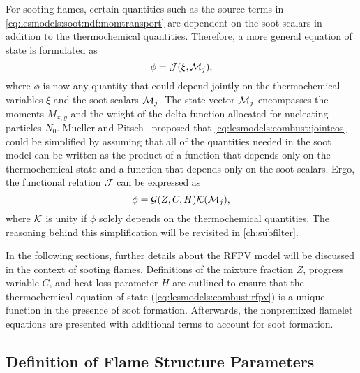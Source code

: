 For sooting flames, certain quantities such as the source terms in \cref{eq:lesmodels:soot:ndf:momtransport} are dependent on the soot scalars in addition to the thermochemical quantities. Therefore, a more general equation of state is formulated as
\begin{equation}\label{eq:lesmodels:combust:jointeos}
  \phi = \mathcal{J}(\xi, \mathcal{M}_j),
\end{equation}
where $\phi$ is now any quantity that could depend jointly on the thermochemical variables $\xi$ and the soot scalars $\mathcal{M}_j$. The state vector $\mathcal{M}_j$ encompasses the moments $M_{x,y}$ and the weight of the delta function allocated for nucleating particles $N_0$. Mueller and Pitsch~\cite{subfilterpdf2011} proposed that \cref{eq:lesmodels:combust:jointeos} could be simplified by assuming that all of the quantities needed in the soot model can be written as the product of a function that depends only on the thermochemical state and a function that depends only on the soot scalars. Ergo, the functional relation $\mathcal{J}$ can be expressed as
\begin{equation}\label{eq:lesmodels:combust:producteos}
  \phi = \mathcal{G}(Z, C, H)\mathcal{K}(\mathcal{M}_j),
\end{equation}
where $\mathcal{K}$ is unity if $\phi$ solely depends on the thermochemical quantities. The reasoning behind this simplification will be revisited in \cref{ch:subfilter}.

In the following sections, further details about the RFPV model will be discussed in the context of sooting flames. Definitions of the mixture fraction $Z$, progress variable $C$, and heat loss parameter $H$ are outlined to ensure that the thermochemical equation of state (\cref{eq:lesmodels:combust:rfpv}) is a unique function in the presence of soot formation. Afterwards, the nonpremixed flamelet equations are presented with additional terms to account for soot formation.


\subsection{Definition of Flame Structure Parameters}
\label{sec:lesmodels:combust:map}

